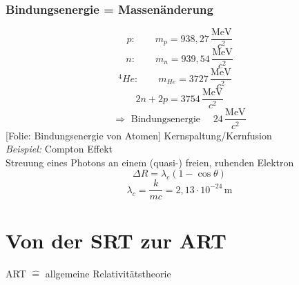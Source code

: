 \documentclass[titlepage,11pt,a4paper,ngerman]{report}
\newcommand{\tx}[1]{\textrm{#1}}
\newcommand{\folie}[1]{\color{gray}[Folie: #1]\color{black}}
\begin{document}
\subsubsection{Bindungsenergie = Massenänderung}

\begin{equation*}
p: \qquad m_p = 938{,}27 \, \frac{\tx{MeV}}{c^2}
\end{equation*}
\begin{equation*}
n: \qquad m_n = 939{,}54 \, \frac{\tx{MeV}}{c^2}
\end{equation*}
\begin{equation*}
^4He: \qquad m_{He} = 3727 \, \frac{\tx{MeV}}{c^2} \ \ \ \;
\end{equation*}
\begin{equation*}
2n + 2p = 3754 \, \frac{\tx{MeV}}{c^2}
\end{equation*}
\begin{equation*}
\Rightarrow \tx{ Bindungsenergie } \quad 24 \, \frac{\tx{MeV}}{c^2}
\end{equation*}
\folie{Bindungsenergie von Atomen} Kernspaltung/Kernfusion\\[5pt]
\emph{Beispiel:} Compton Effekt\\
Streuung eines Photons an einem (quasi-) freien, ruhenden Elektron
\begin{equation*}
\Delta R = \lambda_c (1 - \cos \theta)
\end{equation*}
\begin{equation*}
\lambda_c = \frac{k}{mc} = 2{,}13 \cdot 10^{-24} \, \tx{m}
\end{equation*}

\section{Von der SRT zur ART}
ART $ \widehat{=} $ allgemeine Relativitätstheorie
\end{document}
